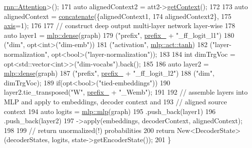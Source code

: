 \begin{DoxyCode}
      \hyperlink{namespacemarian_1_1rnn_ae9586d2236bd64dae0a644c58d9fc76e}{rnn::Attention}>();
171     \textcolor{keyword}{auto} alignedContext2 = att2->\hyperlink{classmarian_1_1rnn_1_1GlobalAttention_ad518e4c82f56b8f95393dffa2df2288b}{getContext}();
172 
173     \textcolor{keyword}{auto} alignedContext = \hyperlink{namespacemarian_a2791a2c8f79a938f5cb22ae613680675}{concatenate}(\{alignedContext1,
174                                        alignedContext2\},
175                                        \hyperlink{namespacemarian_1_1keywords_ace9158eabbddaca833133f12da98b9d6}{axis}=1);
176 
177     \textcolor{comment}{// construct deep output multi-layer network layer-wise}
178     \textcolor{keyword}{auto} layer1 = \hyperlink{namespacemarian_1_1mlp_a8c25b1e343bf78e66cd9e33e607efeb5}{mlp::dense}(graph)
179                   (\textcolor{stringliteral}{"prefix"}, \hyperlink{classmarian_1_1DecoderBase_a043a90801b6bda9a45e309607136e947}{prefix\_} + \textcolor{stringliteral}{"\_ff\_logit\_l1"})
180                   (\textcolor{stringliteral}{"dim"}, opt<int>(\textcolor{stringliteral}{"dim-emb"}))
181                   (\textcolor{stringliteral}{"activation"}, \hyperlink{namespacemarian_1_1mlp_ac16d27a877d16d7394f2057aee439d72a5c0dbba3a6ee4ac0eb26cfee75ccb8b4}{mlp::act::tanh})
182                   (\textcolor{stringliteral}{"layer-normalization"}, opt<bool>(\textcolor{stringliteral}{"layer-normalization"}));
183 
184     \textcolor{keywordtype}{int} dimTrgVoc = opt<std::vector<int>>(\textcolor{stringliteral}{"dim-vocabs"}).back();
185 
186     \textcolor{keyword}{auto} layer2 = \hyperlink{namespacemarian_1_1mlp_a8c25b1e343bf78e66cd9e33e607efeb5}{mlp::dense}(graph)
187                   (\textcolor{stringliteral}{"prefix"}, \hyperlink{classmarian_1_1DecoderBase_a043a90801b6bda9a45e309607136e947}{prefix\_} + \textcolor{stringliteral}{"\_ff\_logit\_l2"})
188                   (\textcolor{stringliteral}{"dim"}, dimTrgVoc);
189     \textcolor{keywordflow}{if}(opt<bool>(\textcolor{stringliteral}{"tied-embeddings"}))
190       layer2.tie\_transposed(\textcolor{stringliteral}{"W"}, \hyperlink{classmarian_1_1DecoderBase_a043a90801b6bda9a45e309607136e947}{prefix\_} + \textcolor{stringliteral}{"\_Wemb"});
191 
192     \textcolor{comment}{// assemble layers into MLP and apply to embeddings, decoder context and}
193     \textcolor{comment}{// aligned source context}
194     \textcolor{keyword}{auto} logits = \hyperlink{namespacemarian_1_1mlp_a4d0fe240d31bdc33bcbdb5401de49e27}{mlp::mlp}(graph)
195                   .push\_back(layer1)
196                   .push\_back(layer2)
197                   ->apply(embeddings, decoderContext, alignedContext);
198 
199     \textcolor{comment}{// return unormalized(!) probabilities}
200     \textcolor{keywordflow}{return} New<DecoderState>(decoderStates, logits, state->getEncoderState());
201   \}
\end{DoxyCode}


